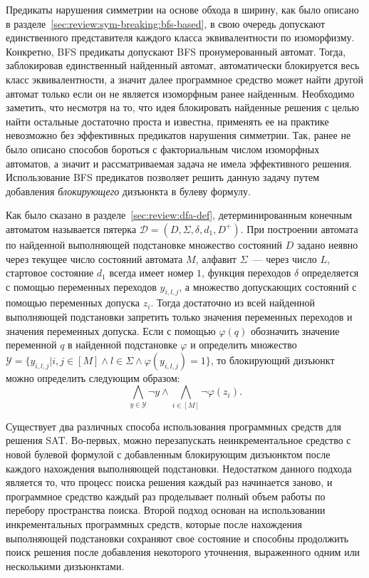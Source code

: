 Предикаты нарушения симметрии на основе обхода в ширину, как было описано в разделе~\ref{sec:review:sym-breaking:bfs-based}, в свою очередь допускают единственного представителя каждого класса эквивалентности по изоморфизму.
Конкретно, BFS предикаты допускают BFS пронумерованный автомат.
Тогда, заблокировав единственный найденный автомат, автоматически блокируется весь класс эквивалентности, а значит далее программное средство может найти другой автомат только если он не является изоморфным ранее найденным.
Необходимо заметить, что несмотря на то, что идея блокировать найденные решения с целью найти остальные достаточно проста и известна, применять ее на практике невозможно без эффективных предикатов нарушения симметрии.
Так, ранее не было описано способов бороться с факториальным числом изоморфных автоматов, а значит и рассматриваемая задача не имела эффективного решения.
Использование BFS предикатов позволяет решить данную задачу путем добавления \emph{блокирующего} дизъюнкта в булеву формулу. 

Как было сказано в разделе~\ref{sec:review:dfa-def}, детерминированным конечным автоматом называется пятерка $\mathcal{D} = \left(D,\Sigma,\delta,d_{1},D^{+}\right)$.
При построении автомата по найденной выполняющей подстановке множество состояний $D$ задано неявно через текущее число состояний автомата $M$, алфавит $\Sigma$~{---} через число $L$, стартовое состояние $d_{1}$ всегда имеет номер $1$, функция переходов $\delta$ определяется с помощью переменных переходов $y_{i,l,j}$, а множество допускающих состояний с помощью переменных допуска $z_{i}$.
Тогда достаточно из всей найденной выполняющей подстановки запретить только значения переменных переходов и значения переменных допуска.
Если с помощью $\varphi\left(q\right)$ обозначить значение переменной $q$ в найденной подстановке $\varphi$ и определить множество $\mathcal{Y} = \{y_{i,l,j} | i,j \in \left[M\right] \wedge l \in \Sigma \wedge \varphi\left(y_{i,l,j}\right) = 1\}$, то блокирующий дизъюнкт можно определить следующим образом: $$\bigwedge_{y \in \mathcal{Y}} \neg y \wedge \bigwedge_{i \in \left[M\right]}\neg \varphi\left(z_{i}\right).$$

Существует два различных способа использования программных средств для решения SAT.
Во-первых, можно перезапускать неинкрементальное средство с новой булевой формулой с добавленным блокирующим дизъюнктом после каждого нахождения выполняющей подстановки.
Недостатком данного подхода является то, что процесс поиска решения каждый раз начинается заново, и программное средство каждый раз проделывает полный объем работы по перебору пространства поиска.
Второй подход основан на использовании инкрементальных программных средств, которые после нахождения выполняющей подстановки сохраняют свое состояние и способны продолжить поиск решения после добавления некоторого уточнения, выраженного одним или несколькими дизъюнктами.


